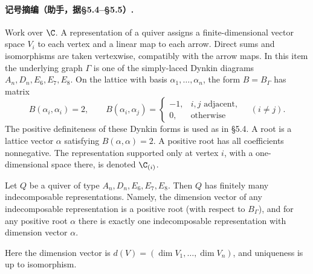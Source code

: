 
\paragraph{记号摘编（助手，据§5.4--§5.5）.}
Work over $\C$. A representation of a quiver assigns a finite-dimensional vector space $V_i$ to each vertex and a linear map to each arrow. Direct sums and isomorphisms are taken vertexwise, compatibly with the arrow maps. In this item the underlying graph $\Gamma$ is one of the simply-laced Dynkin diagrams $A_n,D_n,E_6,E_7,E_8$. On the lattice with basis $\alpha_1,\ldots,\alpha_n$, the form $B=B_\Gamma$ has matrix
\[
B(\alpha_i,\alpha_i)=2,\qquad
B(\alpha_i,\alpha_j)=
\begin{cases}-1,&i,j\text{ adjacent},\\0,&\text{otherwise}\end{cases}\quad(i\ne j).
\]
The positive definiteness of these Dynkin forms is used as in §5.4. A root is a lattice vector $\alpha$ satisfying $B(\alpha,\alpha)=2$. A positive root has all coefficients nonnegative. The representation supported only at vertex $i$, with a one-dimensional space there, is denoted $\C_{(i)}$.

\begin{theorem}
Let $Q$ be a quiver of type $A_n,D_n,E_6,E_7,E_8$. Then $Q$ has finitely many indecomposable representations. Namely, the dimension vector of any indecomposable representation is a positive root (with respect to $B_\Gamma$), and for any positive root $\alpha$ there is exactly one indecomposable representation with dimension vector $\alpha$.
\end{theorem}
Here the dimension vector is $d(V)=(\dim V_1,\ldots,\dim V_n)$, and uniqueness is up to isomorphism.

